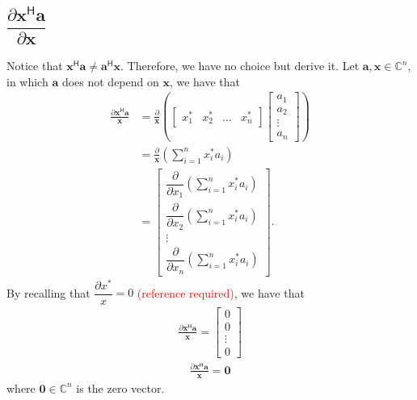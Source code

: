 \documentclass{article}
\newcommand{\hermit}{\mathsf{H}}
\newcommand{\obs}[1]{\textcolor{red}{(#1)}}
\begin{document}
\subsection{\(\dfrac{\partial \mathbf{x}^\hermit \mathbf{a}}{\partial \mathbf{x}}\)}
Notice that \(\mathbf{x}^\hermit \mathbf{a} \neq \mathbf{a}^\hermit \mathbf{x}\). Therefore, we have no choice but derive it. Let \(\mathbf{a, x} \in \mathbb{C}^{n}\), in which \(\mathbf{a}\) does not depend on \(\mathbf{x}\), we have that
\begin{align}
    \frac{\partial \mathbf{x}^\hermit \mathbf{a}}{\mathbf{x}} & = \frac{\partial}{\mathbf{x}} \left(
    \begin{bmatrix}
        x^*_1 & x^*_2 & \dots & x^*_n
    \end{bmatrix} \begin{bmatrix}
        a_{1} \\ a_{2} \\ \vdots \\ a_{n}
    \end{bmatrix} \right) \\
    & = \frac{\partial}{\mathbf{x}} \left( \sum_{i = 1}^n x^*_ia_i \right) \\
    &= \begin{bmatrix}
            \dfrac{\partial}{\partial x_1} \left( \sum_{i = 1}^n x^*_ia_i \right) \\ \dfrac{\partial}{\partial x_2} \left( \sum_{i = 1}^n x^*_ia_i \right) \\ \vdots \\
            \dfrac{\partial}{\partial x_n} \left( \sum_{i = 1}^n x^*_ia_i \right)
        \end{bmatrix}.
\end{align}
By recalling that \(\dfrac{\partial x^*}{x} = 0\) \obs{reference required}, we have that
\begin{align}
    \frac{\partial \mathbf{x}^\hermit \mathbf{a}}{\mathbf{x}} = \begin{bmatrix}
        0 \\ 0 \\ \vdots \\ 0
    \end{bmatrix}
\end{align}
\begin{align}
    \boxed{\frac{\partial \mathbf{x}^\hermit \mathbf{a}}{\mathbf{x}} = \mathbf{0}}
\end{align}
where \(\mathbf{0} \in \mathbb{C}^n\) is the zero vector.
\end{document}
